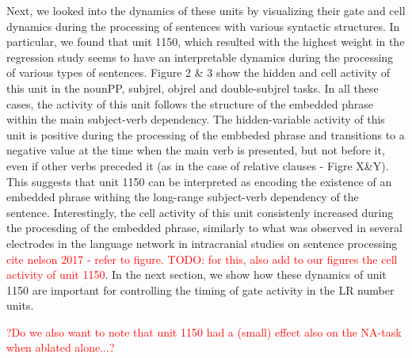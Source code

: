 Next, we looked into the dynamics of these units by visualizing their gate and cell dynamics during the processing of sentences with various syntactic structures. In particular, we found that unit 1150, which resulted with the highest weight in the regression study seems to have an interpretable dynamics during the processing of various types of sentences. Figure 2 \& 3 show the hidden and cell activity of this unit in the nounPP, subjrel, objrel and double-subjrel tasks. In all these cases, the activity of this unit follows the structure of the embedded phrase within the main subject-verb dependency. The hidden-variable activity of this unit is positive during the processing of the embbeded phrase and transitions to a negative value at the time when the main verb is presented, but not before it, even if other verbs preceded it (as in the case of relative clauses - Figre X\&Y). This suggests that unit 1150 can be interpreted as encoding the existence of an embedded phrase withing the long-range subject-verb dependency of the sentence. Interestingly, the cell activity of this unit consistenly increased during the procesding of the embedded phrase, similarly to what was observed in several electrodes in the language network in intracranial studies on sentence processing \textcolor{red}{cite nelson 2017 - refer to figure. TODO: for this, also add to our figures the cell activity of unit 1150}. In the next section, we show how these dynamics of unit 1150 are important for controlling the timing of gate activity in the LR number units.



\textcolor{red}{?Do we also want to note that unit 1150 had a (small) effect also on the NA-task when ablated alone...?}




